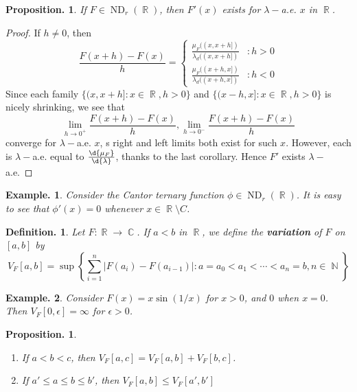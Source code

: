\documentclass[11pt, a4paper]{memoir}
\DeclareMathOperator{\N}{{\mathbb{N}}}
\DeclareMathOperator{\R}{{\mathbb{R}}}
\DeclareMathOperator{\C}{{\mathbb{C}}}
\theoremstyle{change}
\newtheorem{proposition}[theorem]{Proposition.}
\theoremstyle{plain}
\theoremstyle{nonumberplain}
\newtheorem{definition}{Definition.}
\newtheorem{example}{Example.}
\newtheorem{proof}{Proof}
\DeclareMathOperator{\ND}{ND}
\begin{document}
\begin{proposition}
    If $F\in\ND_r(\R)$, then $F'(x)$ exists for $\lambda-$a.e. $x$ in $\R$.
\end{proposition}
\begin{proof}
    If $h\neq 0$, then
    \begin{equation*}
        \frac{F(x+h)-F(x)}{h}=
        \begin{cases}
            \frac{\mu_F((x,x+h])}{\lambda_d((x,x+h])}&:h>0\\
            \frac{\mu_F((x+h,x])}{\lambda_d((x+h,x])}&:h<0
        \end{cases}
    \end{equation*}
    Since each family $\{(x,x+h]:x\in\R,h>0\}$ and $\{(x-h,x]:x\in\R,h>0\}$ is nicely shrinking, we see that
    \begin{equation*}
        \lim_{h\to 0^+}\frac{F(x+h)-F(x)}{h},\lim_{h\to 0^-}\frac{F(x+h)-F(x)}{h}
    \end{equation*}
    converge for $\lambda-$a.e. $x$, s right and left limits both exist for such $x$.
    However, each is $\lambda-$a.e. equal to $\frac{\d{\mu_F}}{\d{\lambda}}$, thanks to the last corollary.
    Hence $F'$ exists $\lambda-$a.e.
\end{proof}
\begin{example}
    Consider the Cantor ternary function $\phi\in\ND_r(\R)$.
    It is easy to see that $\phi'(x)=0$ whenever $x\in\R\setminus C$.
\end{example}
\begin{definition}
    Let $F:\R\to\C$.
    If $a<b$ in $\R$, we define the \textbf{variation} of $F$ on $[a,b]$ by
    \begin{equation*}
        V_F[a,b]=\sup\left\{\sum_{i=1}^n|F(a_i)-F(a_{i-1})|:a=a_0<a_1<\cdots<a_n=b,n\in\N\right\}
    \end{equation*}
\end{definition}
\begin{example}
    Consider $F(x)=x\sin(1/x)$ for $x>0$, and $0$ when $x=0$.
    Then $V_F[0,\epsilon]=\infty$ for $\epsilon>0$.
\end{example}
\begin{proposition}
    \begin{enumerate}[nl,r]
        \item If $a<b<c$, then $V_F[a,c]=V_F[a,b]+V_F[b,c]$.
        \item If $a'\leq a\leq b\leq b'$, then $V_F[a,b]\leq V_F[a',b']$
    \end{enumerate}
\end{proposition}
\end{document}

